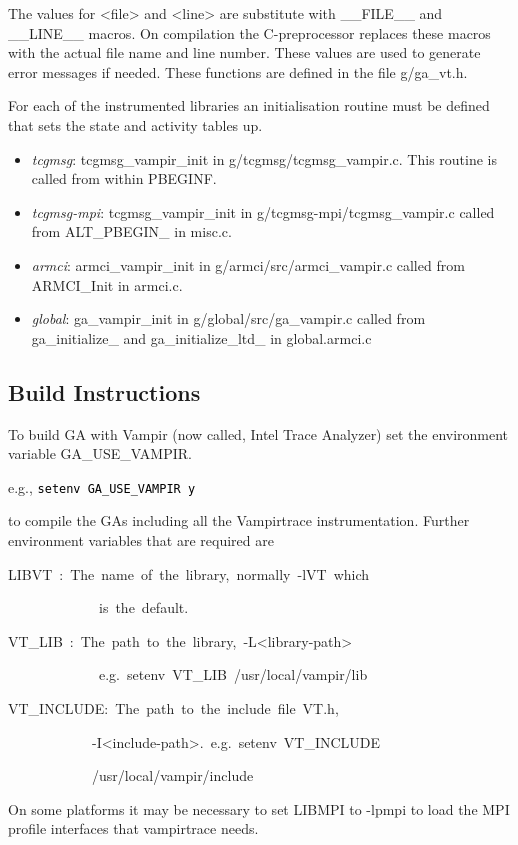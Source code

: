 The values for <file> and <line> are substitute with \_\_FILE\_\_
and \_\_LINE\_\_ macros. On compilation the C-preprocessor replaces
these macros with the actual file name and line number. These values
are used to generate error messages if needed. These functions are
defined in the file g/ga\_vt.h.

For each of the instrumented libraries an initialisation routine must
be defined that sets the state and activity tables up.
\begin{itemize}
\item \emph{tcgmsg}: tcgmsg\_vampir\_init in g/tcgmsg/tcgmsg\_vampir.c.
This routine is called from within PBEGINF. 
\item \emph{tcgmsg-mpi}: tcgmsg\_vampir\_init in g/tcgmsg-mpi/tcgmsg\_vampir.c
called from ALT\_PBEGIN\_ in misc.c. 
\item \emph{armci}: armci\_vampir\_init in g/armci/src/armci\_vampir.c called
from ARMCI\_Init in armci.c. 
\item \emph{global}: ga\_vampir\_init in g/global/src/ga\_vampir.c called
from ga\_initialize\_ and ga\_initialize\_ltd\_ in global.armci.c
\end{itemize}

\subsection{Build Instructions }

To build GA with Vampir (now called, Intel Trace Analyzer) set the
environment variable GA\_USE\_VAMPIR.

e.g., \texttt{\textcolor{black}{setenv GA\_USE\_VAMPIR y}}

to compile the GAs including all the Vampirtrace instrumentation.
Further environment variables that are required are
\begin{lyxcode}
LIBVT~:~The~name~of~the~library,~normally~-lVT~which~

~~~~~~~~~~~~~is~the~default.~

VT\_LIB~:~The~path~to~the~library,~-L<library-path>~

~~~~~~~~~~~~~e.g.~setenv~VT\_LIB~/usr/local/vampir/lib~

VT\_INCLUDE:~The~path~to~the~include~file~VT.h,~

~~~~~~~~~~~~-I<include-path>.~e.g.~setenv~VT\_INCLUDE

~~~~~~~~~~~~/usr/local/vampir/include
\end{lyxcode}
On some platforms it may be necessary to set LIBMPI to -lpmpi to load
the MPI profile interfaces that vampirtrace needs.

